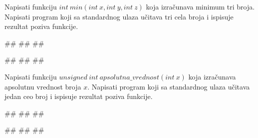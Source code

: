 \begin{Exercise}[label=p1.4_] 
Napisati funkciju $int\ min(int\ x, int\ y, int\ z)$ koja izračunava minimum tri broja. Napisati program koji sa standardnog ulaza učitava tri cela broja i ispisuje rezultat poziva funkcije. \\
\begin{miditest}
\begin{upotreba}{1}
#\naslovInt#
##
##
\end{upotreba}
\end{miditest}
\begin{miditest}
\begin{upotreba}{2}
#\naslovInt#
##
##
\end{upotreba}
\end{miditest}
\end{Exercise}
\begin{Answer}[ref=p1.4_]
\end{Answer}

\begin{Exercise}[label=p1.4_] 
Napisati funkciju $unsigned\ int\ apsolutna\_vrednost(int\ x)$ koja izračunava apsolutnu vrednost broja $x$. Napisati program koji sa standardnog ulaza učitava jedan ceo broj i ispisuje rezultat poziva funkcije.  \\
\begin{miditest}
\begin{upotreba}{1}
#\naslovInt#
##
##
\end{upotreba}
\end{miditest}
\begin{miditest}
\begin{upotreba}{2}
#\naslovInt#
##
##
\end{upotreba}
\end{miditest}

\end{Exercise}
\begin{Answer}[ref=p1.4_]
\end{Answer}

